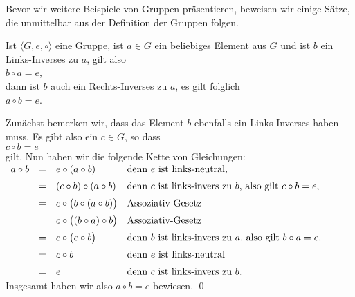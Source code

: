 Bevor wir weitere Beispiele von Gruppen pr\"{a}sentieren, beweisen wir einige S\"{a}tze, die unmittelbar aus der
Definition der Gruppen folgen.

\begin{Satz} \lb
  Ist $\langle G, e, \circ \rangle$ eine Gruppe, ist $a \in G$ ein beliebiges Element aus
  $G$ und ist $b$ ein Links-Inverses zu $a$, gilt also
  \\
  \hspace*{1.3cm}
  $b \circ a = e$,
  \\[0.2cm]
  dann ist $b$ auch ein Rechts-Inverses zu $a$, es gilt folglich
  \\[0.2cm]
  \hspace*{1.3cm}
  $a \circ b = e$.  
\end{Satz}

\proof
Zun\"{a}chst bemerken wir, dass das Element $b$ ebenfalls ein Links-Inverses haben muss.  Es gibt also ein 
$c \in G$, so dass
\\[0.2cm]
\hspace*{1.3cm}
$c \circ b = e$
\\[0.2cm]
gilt.  Nun haben wir die folgende Kette von Gleichungen:
\\[0.2cm]
\hspace*{1.3cm}
$
\begin{array}[t]{lcll}
  a \circ b & = & e \circ (a \circ b)           & \mbox{denn $e$ ist links-neutral,} \\[0.2cm]
            & = & (c \circ b) \circ (a \circ b) 
                & \mbox{denn $c$ ist links-invers zu $b$, also gilt $c \circ b = e$,}  \\[0.2cm]
            & = & c \circ \bigl(b \circ (a \circ b)\bigr) 
                & \mbox{Assoziativ-Gesetz}  \\[0.2cm]
            & = & c \circ \bigl((b \circ a) \circ b\bigr) 
                & \mbox{Assoziativ-Gesetz}  \\[0.2cm]
            & = & c \circ \bigl(e \circ b\bigr) 
                & \mbox{denn $b$ ist links-invers zu $a$, also gilt $b \circ a = e$,}  \\[0.2cm]
            & = & c \circ b 
                & \mbox{denn $e$ ist links-neutral}  \\[0.2cm]
            & = & e 
                & \mbox{denn $c$ ist links-invers zu $b$.}  
\end{array}
$
\\[0.2cm]
Insgesamt haben wir also $a \circ b = e$ bewiesen. \qed

